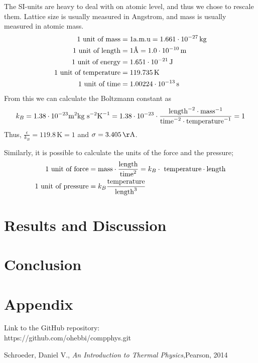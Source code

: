 \documentclass{article}
\begin{document}
The SI-units are heavy to deal with on atomic level, and thus we chose to rescale them. Lattice size is usually measured in Angstrom, and mass is usually measured in atomic mass.
\begin{align}
	1 \textnormal{ unit of mass} &= 1 \textnormal{a.m.u} = 1.661\cdot 10^{-27}\, \textnormal{kg}\\
	1 \textnormal{ unit of length} &= 1 \textnormal{\AA} = 1.0\cdot 10^{-10}\, \textnormal{m}\\
	1 \textnormal{ unit of energy} &= 1.651\cdot 10^{-21}\,\textnormal{J}\\
	1 \textnormal{ unit of temperature} &= 119.735\,\textnormal{K}\\
	1 \textnormal{ unit of time} &= 1.00224\cdot 10^{-13}\, \textnormal{s}
\end{align}
From this we can calculate the Boltzmann constant as
\begin{align}
	k_B = 1.38\cdot 10^{-23} \textnormal{m}^2\textnormal{kg}\textnormal{ s}^{-2}\textnormal{K}^{-1}= 1.38\cdot 10^{-23} \cdot \frac{\textnormal{length}^{-2}\cdot\textnormal{mass}^{-1}}{\textnormal{time}^{-2}\cdot\textnormal{temperature}^{-1}}=1
\end{align}
Thus, $\frac{\epsilon}{k_B}=119.8\, \mathrm{K}=1$ and $\sigma = 3.405\, \mathrm{\AA}$.

Similarly, it is possible to calculate the units of the force and the pressure;
\begin{align}
	\textnormal{1 unit of force} &= \textnormal{mass}\cdot\frac{\textnormal{length}}{\textnormal{time}^2} = k_B \cdot \textnormal{ temperature}\cdot\textnormal{length}\\
	\textnormal{1 unit of pressure} &=k_B \frac{\textnormal{temperature}}{\textnormal{length}^3}
\end{align}


\section{Results and Discussion}





\section{Conclusion}


\section{Appendix}
Link to the GitHub repository:\\

https://github.com/ohebbi/compphys.git

\begin{thebibliography}{}
Schroeder, Daniel V., \textit{An Introduction to Thermal Physics},Pearson, 2014\\
\end{thebibliography}
\end{document}
